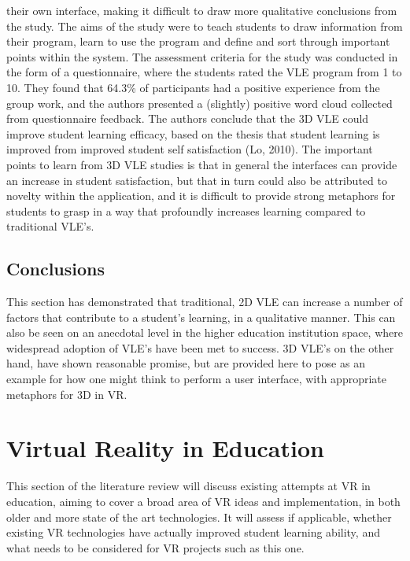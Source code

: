 \documentclass[11pt]{report}
\begin{document}
their own interface, making it difficult to draw more qualitative conclusions from the study. The aims of the study were to teach students to draw information from their program, learn to use the program and define and sort through important points within the system. The assessment criteria for the study was conducted in the form of a questionnaire, where the students rated the VLE program from 1 to 10. They found that 64.3\% of participants had a positive experience from the group work, and the authors presented a (slightly) positive word cloud collected from questionnaire feedback. The authors conclude that the 3D VLE could improve student learning efficacy, based on the thesis that student learning is improved from improved student self satisfaction (Lo, 2010). The important points to learn from 3D VLE studies is that in general the interfaces can provide an increase in student satisfaction, but that in turn could also be attributed to novelty within the application, and it is difficult to provide strong metaphors for students to grasp in a way that profoundly increases learning compared to traditional VLE's.
\subsection{Conclusions}
This section has demonstrated that traditional, 2D VLE can increase a number of factors that contribute to a student's learning, in a qualitative manner. This can also be seen on an anecdotal level in the higher education institution space, where widespread adoption of VLE's have been met to success. 3D VLE's on the other hand, have shown reasonable promise, but are provided here to pose as an example for how one might think to perform a user interface, with appropriate metaphors for 3D in VR. 
\section{Virtual Reality in Education}
This section of the literature review will discuss existing attempts at VR in education, aiming to cover a broad area of VR ideas and implementation, in both older and more state of the art technologies. It will assess if applicable, whether existing VR technologies have actually improved student learning ability, and what needs to be considered for VR projects such as this one.
\end{document}
